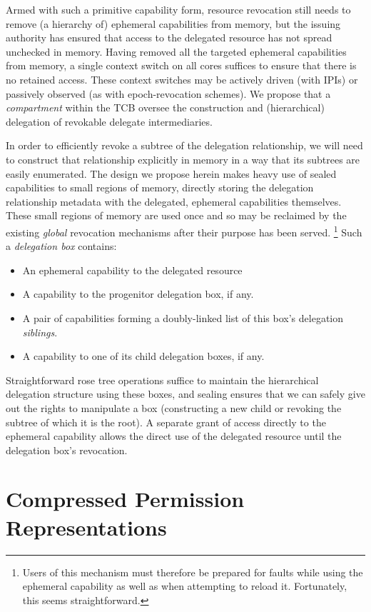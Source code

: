 Armed with such a primitive capability form, resource revocation still needs
to remove (a hierarchy of) ephemeral capabilities from memory, but the
issuing authority has ensured that access to the delegated resource has not
spread unchecked in memory.  Having removed all the targeted ephemeral
capabilities from memory, a single context switch on all cores suffices to
ensure that there is no retained access.  These context switches may be
actively driven (with IPIs) or passively observed (as with epoch-revocation
schemes).  We propose that a \emph{compartment} within the TCB oversee the
construction and (hierarchical) delegation of revokable delegate
intermediaries.

In order to efficiently revoke a subtree of the delegation relationship, we
will need to construct that relationship explicitly in memory in a way that
its subtrees are easily enumerated.  The design we propose herein makes
heavy use of sealed capabilities to small regions of memory, directly
storing the delegation relationship metadata with the delegated, ephemeral
capabilities themselves.  These small regions of memory are used once and so
may be reclaimed by the existing \emph{global} revocation mechanisms after
their purpose has been served.%
%
\footnote{Users of this mechanism must therefore be prepared for faults
while using the ephemeral capability as well as when attempting to reload
it.  Fortunately, this seems straightforward.}
%
Such a \emph{delegation box} contains:
%
\begin{itemize}
%
  \item An ephemeral capability to the delegated resource
%
  \item A capability to the progenitor delegation box, if any.
%
  \item A pair of capabilities forming a doubly-linked list of this box's
delegation \emph{siblings}.
%
  \item A capability to one of its child delegation boxes, if any.
%
\end{itemize}
%
Straightforward rose tree \cite{skillicorn:partreeskel} operations suffice
to maintain the hierarchical delegation structure using these boxes, and
sealing ensures that we can safely give out the rights to manipulate a box
(constructing a new child or revoking the subtree of which it is the root).
A separate grant of access directly to the ephemeral capability allows the
direct use of the delegated resource until the delegation box's revocation.

\section{Compressed Permission Representations} %
\label{app:exp:compressperm}

